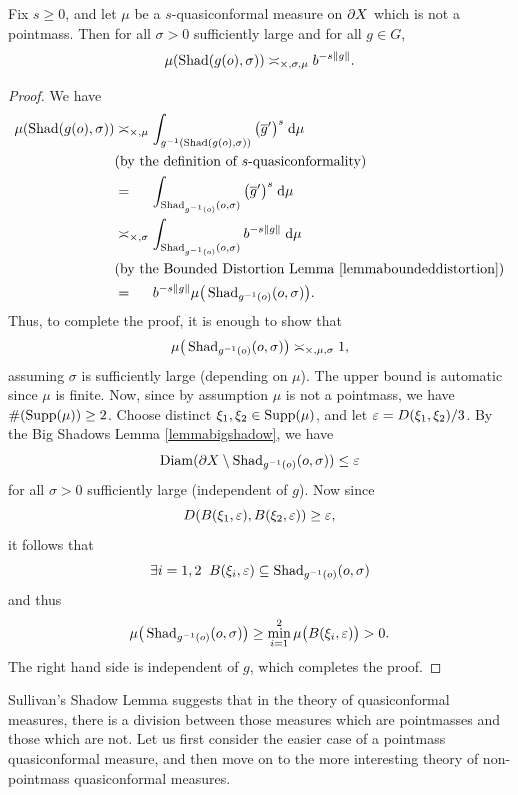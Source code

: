 \begin{lemma}
\label{lemmasullivanshadow}
Fix $s\geq 0$, and let $\mu$ be a $s$-quasiconformal measure on $\partial X$ which is not a pointmass. Then for all $\sigma > 0$ sufficiently large and for all $g\in G$,
\[
\mu(\operatorname{Shad}(g(o),\sigma)) \asymp_{\times,\sigma,\mu} b^{-s \|g\|}.
\]
\end{lemma}
\begin{proof}
We have
\begin{align*}
\mu(\operatorname{Shad}(g(o),\sigma))
&\asymp_{\times,\mu} \int_{g^{-1}(\operatorname{Shad}(g(o),\sigma))}\big(\overline g'\big)^s \;\mathrm{d}\mu\\
& \textup{(by the definition of $s$-quasiconformality)}\\
&=_{\phantom{\times,\mu}} \int_{\operatorname{Shad}_{g^{-1}(o)}(o,\sigma)}\big(\overline g'\big)^s \;\mathrm{d}\mu\\
&\asymp_{\times,\sigma} \int_{\operatorname{Shad}_{g^{-1}(o)}(o,\sigma)}b^{-s\|g\|} \;\mathrm{d}\mu\\
& \textup{(by the Bounded Distortion Lemma \ref{lemmaboundeddistortion})}\\
&=_{\phantom{\times,\mu}} b^{-s\|g\|}\mu\big(\operatorname{Shad}_{g^{-1}(o)}(o,\sigma)\big).
\end{align*}
Thus, to complete the proof, it is enough to show that
\[
\mu\big(\operatorname{Shad}_{g^{-1}(o)}(o,\sigma)\big) \asymp_{\times,\mu,\sigma} 1,
\]
assuming $\sigma$ is sufficiently large (depending on $\mu$). The upper bound is automatic since $\mu$ is finite. Now, since by assumption $\mu$ is not a pointmass, we have $\#(\operatorname{Supp}(\mu))\geq 2$. Choose distinct $\xi_1,\xi_2\in\operatorname{Supp}(\mu)$, and let $\varepsilon = D(\xi_1,\xi_2)/3$. By the Big Shadows Lemma \ref{lemmabigshadow}, we have
\[
\operatorname{Diam}(\partial X\setminus \operatorname{Shad}_{g^{-1}(o)}(o,\sigma)) \leq \varepsilon
\]
for all $\sigma > 0$ sufficiently large (independent of $g$). Now since 
$$D(B(\xi_1,\varepsilon),B(\xi_2,\varepsilon))\geq \varepsilon,$$ it follows that
\[
\exists i = 1,2 \;\; B(\xi_i,\varepsilon)\subseteq \operatorname{Shad}_{g^{-1}(o)}(o,\sigma)
\]
and thus
\[
\mu\big(\operatorname{Shad}_{g^{-1}(o)}(o,\sigma)\big) \geq \min_{i = 1}^2 \mu\big(B(\xi_i,\varepsilon)\big) > 0.
\]
The right hand side is independent of $g$, which completes the proof.
\end{proof}

Sullivan's Shadow Lemma suggests that in the theory of quasiconformal measures, there is a division between those measures which are pointmasses and those which are not. Let us first consider the easier case of a pointmass quasiconformal measure, and then move on to the more interesting theory of non-pointmass quasiconformal measures.

